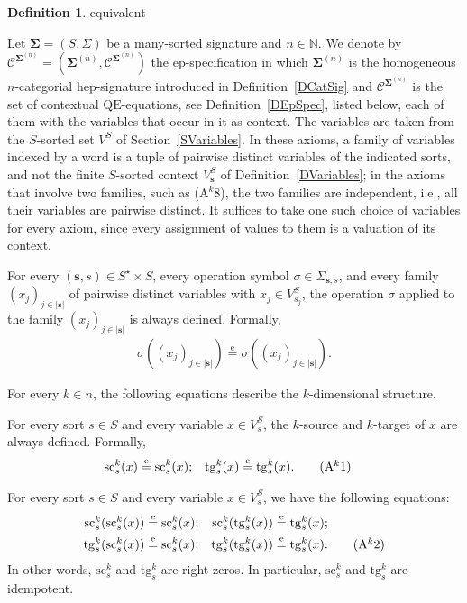 \documentclass[a4paper, reqno]{amsbook}
\makeatletter
\newcommand{\sig}[1]{\mathbf{#1}}             %
\newcommand{\spec}[1]{\boldsymbol{\mathcal{#1}}} %
\newcommand{\eeq}{\overset{\mathrm e}{=}}      %
\newcommand{\QE}{\mathrm{QE}}
\newcommand{\src}{\mathrm{sc}}
\newcommand{\tgt}{\mathrm{tg}}
\theoremstyle{plain}
\theoremstyle{definition}
\newtheorem{definition}[theorem]{Definition}
\newcommand*{\CA@leanpending}{}
\newcommand*{\CA@leanrelation}{}
\newcommand*{\lean}[2]{%
  \ifcsname\string\color@lean@#1\endcsname\else
    \PackageError{main}{Unknown relation `#1' in \string\lean}{Use equivalent, weaker or stronger.}%
  \fi
  \gdef\CA@leanrelation{#1}%
  \gdef\CA@leanpending{#2}}
\makeatother
\begin{document}
\begin{definition}\label{DCatSpec}\lean{equivalent}{Homogeneous.specification}
Let $\sig{\Sigma}=(S,\Sigma)$ be a many-sorted signature and $n\in\mathbb{N}$.
We denote by $\spec{C}^{\sig{\Sigma}^{(n)}}=(\sig{\Sigma}^{(n)},\mathcal{C}^{\sig{\Sigma}^{(n)}})$ the ep-specification in which $\sig{\Sigma}^{(n)}$ is the homogeneous $n$-categorial hep-signature introduced in Definition~\ref{DCatSig} and $\mathcal{C}^{\sig{\Sigma}^{(n)}}$ is the set of contextual $\QE$-equations, see Definition~\ref{DEpSpec}, listed below, each of them with the variables that occur in it as context.
The variables are taken from the $S$-sorted set $V^{S}$ of Section~\ref{SVariables}.
In these axioms, a family of variables indexed by a word is a tuple of pairwise distinct variables of the indicated sorts, and not the finite $S$-sorted context $V^{S}_{\mathbf{s}}$ of Definition~\ref{DVariables}; in the axioms that involve two families, such as (A$^{k}$8), the two families are independent, i.e., all their variables are pairwise distinct.
It suffices to take one such choice of variables for every axiom, since every assignment of values to them is a valuation of its context.

For every $(\mathbf{s},s)\in S^{\star}\times S$, every operation symbol $\sigma\in \Sigma_{\mathbf{s},s}$, and every family $(x_{j})_{j\in \lvert\mathbf{s}\rvert}$ of pairwise distinct variables with $x_{j}\in V^{S}_{s_{j}}$, the operation $\sigma$ applied to the family $(x_{j})_{j\in \lvert\mathbf{s}\rvert}$ is always defined.
Formally,
\begin{align*}
\sigma((x_{j})_{j\in \lvert\mathbf{s}\rvert})\eeq\sigma((x_{j})_{j\in \lvert\mathbf{s}\rvert}).\label{ACatA0}\tag{A0}
\end{align*}

For every $k\in n$, the following equations describe the $k$-dimensional structure.

For every sort $s\in S$ and every variable $x\in V^{S}_{s}$, the $k$-source and $k$-target of $x$ are always defined.
Formally,
\begin{align*}
\src^{k}_{s}(x)&\eeq\src^{k}_{s}(x);
&
\tgt^{k}_{s}(x)&\eeq\tgt^{k}_{s}(x).\label{ACatAk1}\tag{A$^{k}$1}
\end{align*}

For every sort $s\in S$ and every variable $x\in V^{S}_{s}$, we have the following equations:
\begin{align*}
\src^{k}_{s}(\src^{k}_{s}(x))&\eeq\src^{k}_{s}(x);
&
\src^{k}_{s}(\tgt^{k}_{s}(x))&\eeq\tgt^{k}_{s}(x);\\
\tgt^{k}_{s}(\src^{k}_{s}(x))&\eeq\src^{k}_{s}(x);
&
\tgt^{k}_{s}(\tgt^{k}_{s}(x))&\eeq\tgt^{k}_{s}(x).\label{ACatAk2}\tag{A$^{k}$2}
\end{align*}
In other words, $\src^{k}_{s}$ and $\tgt^{k}_{s}$ are right zeros.
In particular, $\src^{k}_{s}$ and $\tgt^{k}_{s}$ are idempotent.


\end{definition}
\end{document}
